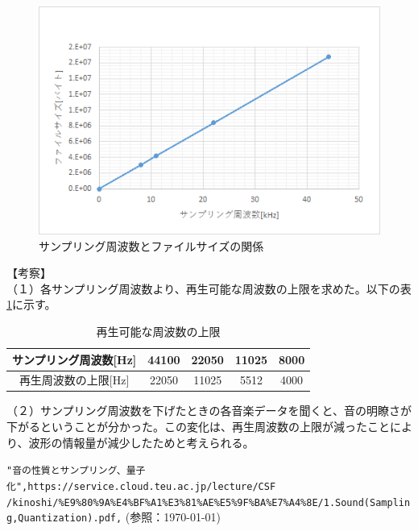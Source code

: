 \documentclass[uplatex, titlepage]{jsarticle}
\begin{document}
\begin{figure}[H]
  \centering
  \includegraphics[scale=1.3]{./tuusin1.4/gra.png}
  \caption{サンプリング周波数とファイルサイズの関係}
  \label{graphicx:last}
\end{figure}

【考察】\\
（１）各サンプリング周波数より、再生可能な周波数の上限を求めた。以下の表\ref{table:last}に示す。

\begin{table}[H]
  \centering
  \caption{再生可能な周波数の上限}
  \label{table:last}
  \begin{tabular}{|c|c|c|c|c|} \hline
    サンプリング周波数[Hz] & 44100 & 22050 & 11025 & 8000 \\ \hline
    再生周波数の上限[Hz] & 22050 & 11025 & 5512 & 4000 \\ \hline
  \end{tabular}
\end{table}

（２）サンプリング周波数を下げたときの各音楽データを聞くと、音の明瞭さが下がるということが分かった。この変化は、再生周波数の上限が減ったことにより、波形の情報量が減少したためと考えられる。

\begin{thebibliography}{99}
   \verb+"音の性質とサンプリング、量子化",https://service.cloud.teu.ac.jp/lecture/CSF+
  \verb+/kinoshi/%E9%80%9A%E4%BF%A1%E3%81%AE%E5%9F%BA%E7%A4%8E/1.Sound(Sampling,Quantization).pdf,+
  (参照：\today)
  \end{thebibliography}
\end{document}
